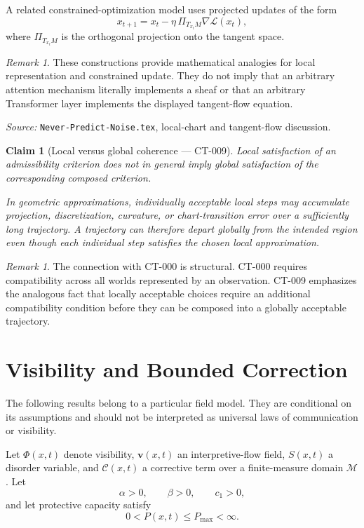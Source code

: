 \documentclass[11pt]{article}
\newtheorem{claim}[theorem]{Claim}
\theoremstyle{definition}
\theoremstyle{remark}
\newtheorem{remark}[theorem]{Remark}
\newcommand{\manifold}{\mathcal{M}}
\begin{document}
A related constrained-optimization model uses projected updates of the form
\[
  x_{t+1}
  =
  x_t
  -
  \eta\,
  \Pi_{T_{x_t}M}
  \nabla\mathcal{L}(x_t),
\]
where $\Pi_{T_{x_t}M}$ is the orthogonal projection onto the tangent space.

\begin{remark}
These constructions provide mathematical analogies for local representation
and constrained update. They do not imply that an arbitrary attention
mechanism literally implements a sheaf or that an arbitrary Transformer layer
implements the displayed tangent-flow equation.
\end{remark}

\noindent\emph{Source:} \texttt{Never-Predict-Noise.tex}, local-chart and
tangent-flow discussion.

\begin{claim}[Local versus global coherence --- CT-009]
Local satisfaction of an admissibility criterion does not in general imply
global satisfaction of the corresponding composed criterion.

In geometric approximations, individually acceptable local steps may
accumulate projection, discretization, curvature, or chart-transition error
over a sufficiently long trajectory. A trajectory can therefore depart
globally from the intended region even though each individual step satisfies
the chosen local approximation.
\end{claim}

\begin{remark}
The connection with CT-000 is structural. CT-000 requires compatibility across
all worlds represented by an observation. CT-009 emphasizes the analogous
fact that locally acceptable choices require an additional compatibility
condition before they can be composed into a globally acceptable trajectory.
\end{remark}

\section{Visibility and Bounded Correction}

The following results belong to a particular field model. They are conditional
on its assumptions and should not be interpreted as universal laws of
communication or visibility.

Let $\Phi(x,t)$ denote visibility, $\mathbf{v}(x,t)$ an interpretive-flow
field, $S(x,t)$ a disorder variable, and $\mathcal{C}(x,t)$ a corrective term
over a finite-measure domain $\manifold$. Let
\[
  \alpha>0,\qquad \beta>0,\qquad c_1>0,
\]
and let protective capacity satisfy
\[
  0<P(x,t)\leq P_{\max}<\infty.
\]
\end{document}
